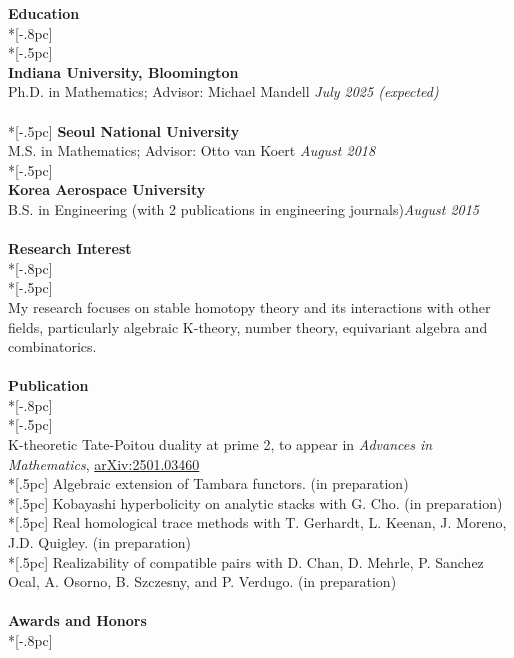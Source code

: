 \documentclass{article}
\begin{document}
{\Large \bf Education} \\*[-.8pc]
\underline{\hspace{6.5in}} \\*[-.5pc]
\\
{\bf Indiana University, Bloomington}\\ 
{Ph.D. in Mathematics; Advisor: Michael Mandell} \hfill {\it  July 2025  (expected)} \\
\\*[-.5pc]
{\bf Seoul National University} \\ 
{M.S. in Mathematics; Advisor: Otto van Koert} \hfill{\it August 2018 } \\*[-.5pc]
\\
{\bf Korea Aerospace University} \\
{B.S. in Engineering (with 2 publications in engineering journals)}\hfill{\it August 2015}\\
\\
{\Large \bf Research Interest} \\*[-.8pc]
\underline{\hspace{6.5in}} \\*[-.5pc]
\\
My research focuses on stable homotopy theory and its interactions with other fields, particularly algebraic K-theory, number theory, equivariant algebra and combinatorics.
\\
\\
{\Large \bf Publication} \\*[-.8pc]
\underline{\hspace{6.5in}} \\*[-.5pc]
\\
{K-theoretic Tate-Poitou duality at prime 2}, to appear in {\it Advances in Mathematics}, \href{https://arxiv.org/abs/2501.03460}{arXiv:2501.03460}\\*[.5pc]
{Algebraic extension of Tambara functors}. (in preparation)\\*[.5pc]
{Kobayashi hyperbolicity on analytic stacks} with G. Cho. (in preparation)\\*[.5pc]
{Real homological trace methods} with T. Gerhardt, L. Keenan, J. Moreno, J.D. Quigley. (in preparation)\\*[.5pc]
{Realizability of compatible pairs} with D. Chan, D. Mehrle, P. Sanchez Ocal, A. Osorno, B. Szczesny, and P. Verdugo. (in preparation)\\
\\ 
{\Large \bf Awards and Honors} \\*[-.8pc]
\end{document}
